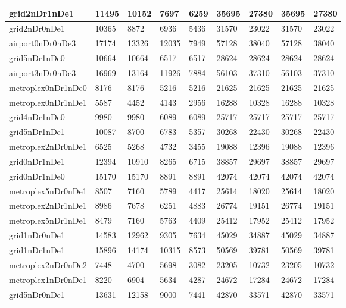 \documentclass[../thesis.tex]{subfiles}
\begin{document}
\begin{table}[!ht]
\begin{tabular}{|l|l|l|l|l|l|l|l|l|}
        grid2nDr1nDe1 & 11495 & 10152 & 7697 & 6259 & 35695 & 27380 & 35695 & 27380 \\ \hline
        grid2nDr0nDe1 & 10365 & 8872 & 6936 & 5436 & 31570 & 23022 & 31570 & 23022 \\ \hline
        airport0nDr0nDe3 & 17174 & 13326 & 12035 & 7949 & 57128 & 38040 & 57128 & 38040 \\ \hline
        grid5nDr1nDe0 & 10664 & 10664 & 6517 & 6517 & 28624 & 28624 & 28624 & 28624 \\ \hline
        airport3nDr0nDe3 & 16969 & 13164 & 11926 & 7884 & 56103 & 37310 & 56103 & 37310 \\ \hline
        metroplex0nDr1nDe0 & 8176 & 8176 & 5216 & 5216 & 21625 & 21625 & 21625 & 21625 \\ \hline
        metroplex0nDr1nDe1 & 5587 & 4452 & 4143 & 2956 & 16288 & 10328 & 16288 & 10328 \\ \hline
        grid4nDr1nDe0 & 9980 & 9980 & 6089 & 6089 & 25717 & 25717 & 25717 & 25717 \\ \hline
        grid5nDr1nDe1 & 10087 & 8700 & 6783 & 5357 & 30268 & 22430 & 30268 & 22430 \\ \hline
        metroplex2nDr0nDe1 & 6525 & 5268 & 4732 & 3455 & 19088 & 12396 & 19088 & 12396 \\ \hline
        grid0nDr1nDe1 & 12394 & 10910 & 8265 & 6715 & 38857 & 29697 & 38857 & 29697 \\ \hline
        grid0nDr1nDe0 & 15170 & 15170 & 8891 & 8891 & 42074 & 42074 & 42074 & 42074 \\ \hline
        metroplex5nDr0nDe1 & 8507 & 7160 & 5789 & 4417 & 25614 & 18020 & 25614 & 18020 \\ \hline
        metroplex2nDr1nDe1 & 8986 & 7678 & 6251 & 4883 & 26774 & 19151 & 26774 & 19151 \\ \hline
        metroplex5nDr1nDe1 & 8479 & 7160 & 5763 & 4409 & 25412 & 17952 & 25412 & 17952 \\ \hline
        grid1nDr0nDe1 & 14583 & 12962 & 9305 & 7634 & 45029 & 34887 & 45029 & 34887 \\ \hline
        grid1nDr1nDe1 & 15896 & 14174 & 10315 & 8573 & 50569 & 39781 & 50569 & 39781 \\ \hline
        metroplex2nDr0nDe2 & 7448 & 4700 & 5698 & 3082 & 23205 & 10732 & 23205 & 10732 \\ \hline
        metroplex1nDr0nDe1 & 8220 & 6904 & 5634 & 4287 & 24672 & 17284 & 24672 & 17284 \\ \hline
        grid5nDr0nDe1 & 13631 & 12158 & 9000 & 7441 & 42870 & 33571 & 42870 & 33571 \\ \hline

\end{tabular}
\end{table}
\end{document}
